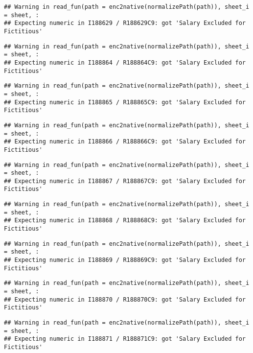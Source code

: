 \documentclass[
]{article}
\begin{document}
\begin{verbatim}
## Warning in read_fun(path = enc2native(normalizePath(path)), sheet_i = sheet, :
## Expecting numeric in I188629 / R188629C9: got 'Salary Excluded for Fictitious'
\end{verbatim}

\begin{verbatim}
## Warning in read_fun(path = enc2native(normalizePath(path)), sheet_i = sheet, :
## Expecting numeric in I188864 / R188864C9: got 'Salary Excluded for Fictitious'
\end{verbatim}

\begin{verbatim}
## Warning in read_fun(path = enc2native(normalizePath(path)), sheet_i = sheet, :
## Expecting numeric in I188865 / R188865C9: got 'Salary Excluded for Fictitious'
\end{verbatim}

\begin{verbatim}
## Warning in read_fun(path = enc2native(normalizePath(path)), sheet_i = sheet, :
## Expecting numeric in I188866 / R188866C9: got 'Salary Excluded for Fictitious'
\end{verbatim}

\begin{verbatim}
## Warning in read_fun(path = enc2native(normalizePath(path)), sheet_i = sheet, :
## Expecting numeric in I188867 / R188867C9: got 'Salary Excluded for Fictitious'
\end{verbatim}

\begin{verbatim}
## Warning in read_fun(path = enc2native(normalizePath(path)), sheet_i = sheet, :
## Expecting numeric in I188868 / R188868C9: got 'Salary Excluded for Fictitious'
\end{verbatim}

\begin{verbatim}
## Warning in read_fun(path = enc2native(normalizePath(path)), sheet_i = sheet, :
## Expecting numeric in I188869 / R188869C9: got 'Salary Excluded for Fictitious'
\end{verbatim}

\begin{verbatim}
## Warning in read_fun(path = enc2native(normalizePath(path)), sheet_i = sheet, :
## Expecting numeric in I188870 / R188870C9: got 'Salary Excluded for Fictitious'
\end{verbatim}

\begin{verbatim}
## Warning in read_fun(path = enc2native(normalizePath(path)), sheet_i = sheet, :
## Expecting numeric in I188871 / R188871C9: got 'Salary Excluded for Fictitious'
\end{verbatim}
\end{document}
